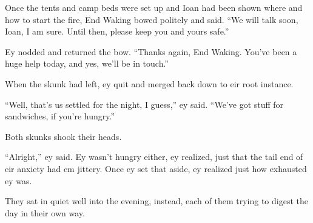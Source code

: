 Once the tents and camp beds were set up and Ioan had been shown where and how to start the fire, End Waking bowed politely and said. ``We will talk soon, Ioan, I am sure. Until then, please keep you and yours safe.''

Ey nodded and returned the bow. ``Thanks again, End Waking. You've been a huge help today, and yes, we'll be in touch.''

When the skunk had left, ey quit and merged back down to eir root instance.

``Well, that's us settled for the night, I guess,'' ey said. ``We've got stuff for sandwiches, if you're hungry.''

Both skunks shook their heads.

``Alright,'' ey said. Ey wasn't hungry either, ey realized, just that the tail end of eir anxiety had em jittery. Once ey set that aside, ey realized just how exhausted ey was.

They sat in quiet well into the evening, instead, each of them trying to digest the day in their own way.
